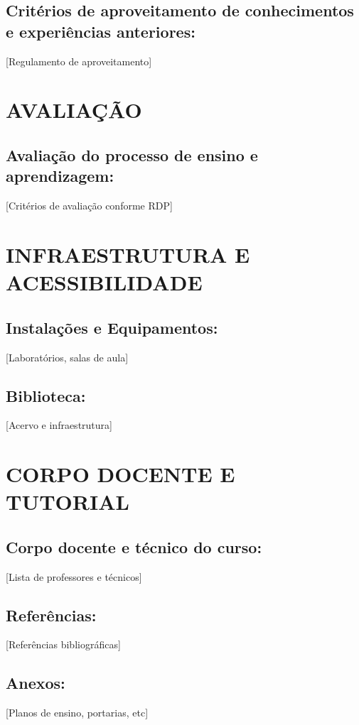 \documentclass{../../modelos/latex-shared/ifsc-ppc}
\begin{document}
\subsection{Critérios de aproveitamento de conhecimentos e experiências anteriores:}
[Regulamento de aproveitamento]

\section{AVALIAÇÃO}
\subsection{Avaliação do processo de ensino e aprendizagem:}
[Critérios de avaliação conforme RDP]

\section{INFRAESTRUTURA E ACESSIBILIDADE}
\subsection{Instalações e Equipamentos:}
[Laboratórios, salas de aula]

\subsection{Biblioteca:}
[Acervo e infraestrutura]

\section{CORPO DOCENTE E TUTORIAL}
\subsection{Corpo docente e técnico do curso:}
[Lista de professores e técnicos]

\subsection{Referências:}
[Referências bibliográficas]

\subsection{Anexos:}
[Planos de ensino, portarias, etc]
\end{document}
